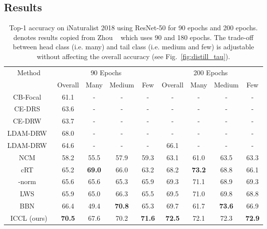 \subsection{Results}
\begin{table*}[!t]
	
	\centering
	
	\begin{tabular}	{c| c c c  c| c c c c }
		\hline	 	 	
			\multirow{2}{*}{Method} & \multicolumn{4}{c|}{90 Epochs}  & \multicolumn{4}{c}{200 Epochs} \\
			&  Overall & Many & Medium & Few  &  Overall & Many & Medium & Few \\
			\hline	 
			CB-Focal~\cite{cbloss}                                                & 61.1 &  -    &   -   &   -   & - &  -    &   -   &   - \\
			CE-DRS~\cite{ldam}                                         & 63.6 &  -    &  -    &   -   & - &  -    &   -   &   - \\
			CE-DRW~\cite{ldam}                                    & 63.7 &   -   &  -    &  -    & - &  -    &   -   &   -  \\
			LDAM-DRW~\cite{ldam}                                                & 68.0 &   -   &    -  &  -    & - &  -    &   -   &   - \\
			LDAM-DRW~\cite{ldam}                               & 64.6 &   -   &    -  &  -    & 66.1 &   -   &    -  &  -  \\
			NCM~\cite{decouple-longtail}                                          & 58.2 & 55.5 & 57.9 & 59.3  & 63.1 & 61.0 & 63.5 & 63.3 \\
			cRT~\cite{decouple-longtail}                                                  & 65.2 & \textbf{69.0} & 66.0 & 63.2 & 68.2 & \textbf{73.2} & 68.8 & 66.1\\
			-norm~\cite{decouple-longtail}                          & 65.6 & 65.6 & 65.3 & 65.9 & 69.3 & 71.1 & 68.9 & 69.3\\
			LWS~\cite{decouple-longtail}                                              & 65.9 & 65.0 & 66.3 & 65.5 & 69.5 & 71.0 & 69.8 & 68.8\\
			BBN~\cite{bbn}                                               & 66.4 & 49.4 &  \textbf{70.8} & 65.3 & 69.7 & 61.7 & \textbf{73.6} & 66.9 \\

			ICCL (ours) &  \textbf{70.5} & 67.6 & 70.2 &  \textbf{71.6} & \textbf{72.5} & 72.1 & 72.3 & \textbf{72.9} \\

			
		\hline	 
	\end{tabular}
    \vspace{-1ex}
	\caption
		{\small	
		Top-1 accuracy on iNaturalist 2018 using ResNet-50 for 90 epochs and 200 epochs.  denotes results copied from Zhou \etal ~\cite{bbn}
		which uses 90 and 180 epochs.
        The trade-off between head class (i.e. many) and tail class (i.e. medium and few) is adjustable without affecting the overall accuracy (see Fig.~\ref{fig:distill_tau}).
		}
	\label{tbl:inat18_new}
\vspace{-2ex}
\end{table*}		
